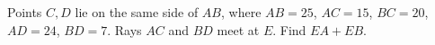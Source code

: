 Points $C,D$ lie on the same side of $AB$, where $AB=25$, $AC=15$, $BC=20$, $AD=24$, $BD=7$. Rays $AC$ and $BD$ meet at $E$. Find $EA+EB$.
